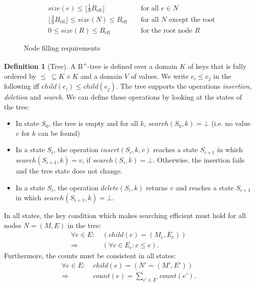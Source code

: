 \documentclass[a4paper, 9pt]{scrartcl}
\theoremstyle{plain}
\theoremstyle{definition}
\newtheorem{defi}[thm]{Definition}
\theoremstyle{remark}
\newcommand{\Beff}{ B_{\text{eff}} }
\begin{document}
\begin{multicols}{2}
\begin{figure*}
\newdimen \shortlinewidth {}\linewidth
\centering
\begin{minipage}{\shortlinewidth}
\begin{align}
& size(e) \leq \lfloor \tfrac{1}{8} \Beff \rfloor
	&& \text{ for all } e \in N \label{bt:maxsize}\\
& \lfloor \tfrac{3}{8} \Beff \rfloor \leq size(N) \leq \Beff
	&& \text{ for all } N \text{ except the root} \label{bt:minsize}\\
& 0 \leq size(R) \leq \Beff
	&& \text{ for the root node } R \label{bt:rootminsize}
\end{align}
\end{minipage}
\caption{Node filling requirements}
\label{bt:fill}
\end{figure*}

\begin{defi}[Tree]
A B\textsuperscript{+}-tree is defined over a domain $K$ of keys that is fully
ordered by \mbox{$\leq \ \subseteq K \times K$} and a domain $V$ of values.
We write \mbox{$e_i \leq e_j$} in the following iff
\mbox{$child(e_i) \leq child(e_j)$}.
The tree supports the operations {\em insertion}, {\em deletion} and 
{\em search}. We can define these operations by looking at the states of the
tree:
\begin{itemize}
\item In state $S_0$, the tree is empty and for all $k$,
	\mbox{$search(S_0, k) = \bot$} (i.e. no value $v$ for $k$ can be found)
\item In a state $S_i$, the operation \mbox{$insert(S_i, k, v)$} reaches a
	state $S_{i+1}$ in which \mbox{$search(S_{i+1}, k) = v$},
	if \mbox{$search(S_i, k) = \bot$}. Otherwise, the insertion fails and the
	tree state does not change.
\item In a state $S_i$, the operation \mbox{$delete(S_i, k)$} returns $v$ and
	reaches a state $S_{i+1}$ in which \mbox{$search(S_{i+1}, k) = \bot$}.
\end{itemize}
In all states, the key condition which makes searching efficient must hold
for all nodes \mbox{$N = (M, E)$} in the tree:
\begin{align*}
\forall e \in E: \ & (child(e) = (M_e, E_e))\\
     \Rightarrow \ & (\forall c \in E_e: c \leq e).
\end{align*}
Furthermore, the counts must be consistent in all states:
\begin{align*}
\forall e \in E: \ & child(e) = (N' = (M', E'))\\
     \Rightarrow \ & count(e) = \sum_{e' \in E'} count(e').
\end{align*}


\end{defi}
\end{multicols}
\end{document}
